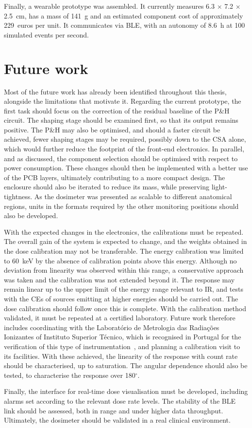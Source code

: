 Finally, a wearable prototype was assembled. It currently measures 6.3 $\times$ 7.2 $\times$ 2.5~cm, has a mass of 141~g and an estimated component cost of approximately 229~euros per unit. It communicates via BLE, with an autonomy of 8.6~h at 100 simulated events per second.


\section{Future work}

Most of the future work has already been identified throughout this thesis, alongside the
limitations that motivate it. Regarding the current prototype, the first task should focus
on the correction of the residual baseline of the P\&H circuit. The shaping stage should be
examined first, so that its output remains positive. The P\&H  may also be
optimised, and should a faster circuit be achieved, fewer shaping stages may be required,
possibly down to the CSA alone, which would further reduce the footprint of the front-end
electronics. In parallel, and as discussed, the component selection should be optimised
with respect to power consumption. These changes should then be implemented with a better
use of the PCB layers, ultimately contributing to a more compact design. The enclosure
should also be iterated to reduce its mass, while
preserving light-tightness. As the dosimeter was presented as scalable to different
anatomical regions, units in the formats required by the other monitoring positions
should also be developed.

With the expected changes in the electronics, the calibrations must be repeated. The
overall gain of the system is expected to change, and the weights obtained in the dose calibration
may not be transferable. The energy calibration was limited to 60~keV by the absence of
calibration points above this energy. Although no deviation from linearity was observed
within this range, a conservative approach was taken and the calibration was not extended
beyond it. The response may remain linear up to the upper limit of the energy range
relevant to IR, and tests with the CEs of sources emitting at higher energies should be
carried out. The dose calibration should follow once this is complete. With the calibration method
validated, it must be repeated at a certified laboratory. Future work therefore includes
coordinating with the Laboratório de Metrologia das Radiações Ionizantes of
Instituto Superior Técnico, which is recognised in Portugal for the verification of this
type of instrumentation~\cite{lmri}, and planning a calibration visit
to its facilities. With these achieved, the linearity of the response with count rate should be
characterised, up to saturation. The angular dependence should also be tested, to
characterise the response over 180$^\circ$.

Finally, the interface for real-time dose visualisation must be developed, including
alarms set according to the relevant dose rate levels. The stability of the BLE link
should be assessed, both in range and under higher data throughput. Ultimately, the
dosimeter should be validated in a real clinical environment.

